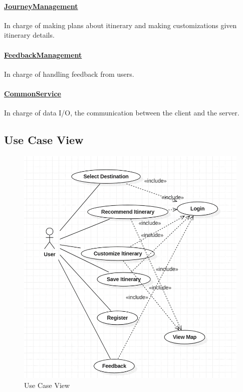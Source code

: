 \documentclass[10pt]{article}
\begin{document}
\paragraph{\underline{JourneyManagement}} In charge of making plans about itinerary and making customizations given itinerary details.

\paragraph{\underline{FeedbackManagement}} In charge of handling feedback from users.

\paragraph{\underline{CommonService}} In charge of data I/O, the communication between the client and the server.

\subsection{Use Case View}
\begin{figure}[H]
	\centering
	
	\includegraphics[width=14cm]{usecase.png}
	\caption{Use Case View}
	\label{Use Case View}
\end{figure}
\end{document}
